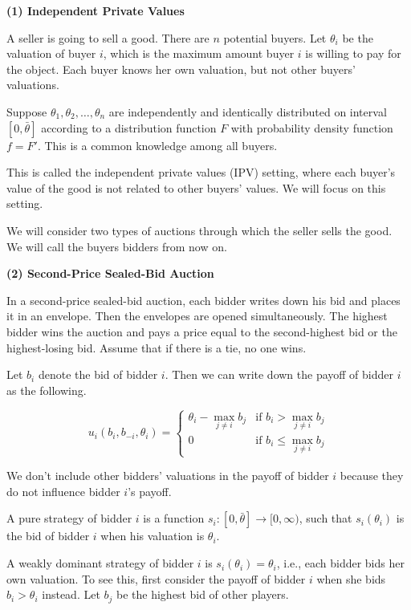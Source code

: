 \documentclass[12pt, oneside]{article}
\begin{document}
\textbf{(1) Independent Private Values}

A seller is going to sell a good. There are \( n \) potential buyers. Let \( \theta_i \) be the valuation of buyer \( i \), which is the maximum amount buyer \( i \) is willing to pay for the object. Each buyer knows her own valuation, but not other buyers’ valuations.

Suppose \( \theta_1, \theta_2, \dots, \theta_n \) are independently and identically distributed on interval \( [0, \bar{\theta}] \) according to a distribution function \( F \) with probability density function \( f = F' \). This is a common knowledge among all buyers.

This is called the independent private values (IPV) setting, where each buyer’s value of the good is not related to other buyers’ values. We will focus on this setting.

We will consider two types of auctions through which the seller sells the good. We will call the buyers bidders from now on.

\textbf{(2) Second-Price Sealed-Bid Auction}

In a second-price sealed-bid auction, each bidder writes down his bid and places it in an envelope. Then the envelopes are opened simultaneously. The highest bidder wins the auction and pays a price equal to the second-highest bid or the highest-losing bid. Assume that if there is a tie, no one wins.

Let \( b_i \) denote the bid of bidder \( i \). Then we can write down the payoff of bidder \( i \) as the following.

\[
u_i(b_i, b_{-i}, \theta_i) =
\begin{cases}
\theta_i - \max_{j \neq i} b_j & \text{if } b_i > \max_{j \neq i} b_j \\
0 & \text{if } b_i \leq \max_{j \neq i} b_j
\end{cases}
\]

We don’t include other bidders’ valuations in the payoff of bidder \( i \) because they do not influence bidder \( i \)’s payoff.

A pure strategy of bidder \( i \) is a function \( s_i : [0, \bar{\theta}] \to [0, \infty) \), such that \( s_i(\theta_i) \) is the bid of bidder \( i \) when his valuation is \( \theta_i \).

A weakly dominant strategy of bidder \( i \) is \( s_i(\theta_i) = \theta_i \), i.e., each bidder bids her own valuation. To see this, first consider the payoff of bidder \( i \) when she bids \( b_i > \theta_i \) instead. Let \( b_j \) be the highest bid of other players.
\end{document}

